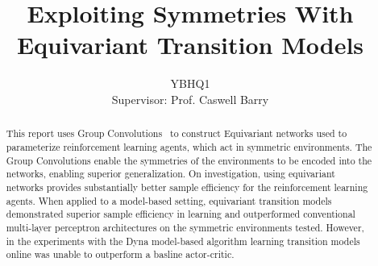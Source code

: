 
\title{Exploiting Symmetries With Equivariant Transition Models}
\author{YBHQ1\\Supervisor: Prof. Caswell Barry}

\maketitle

\begin{abstract} %
	This report uses Group Convolutions~\cite{cohen2016group} to construct Equivariant networks used to parameterize reinforcement learning agents, which act in symmetric environments. The Group Convolutions enable the symmetries of the environments to be encoded into the networks, enabling superior generalization. On investigation, using equivariant networks provides substantially better sample efficiency for the reinforcement learning agents. When applied to a model-based setting, equivariant transition models demonstrated superior sample efficiency in learning and outperformed conventional multi-layer perceptron architectures on the symmetric environments tested. However, in the experiments with the Dyna model-based algorithm learning transition models online was unable to outperform a basline actor-critic.
\end{abstract}


\setcounter{tocdepth}{2}

\tableofcontents
\listoffigures
\listoftables

